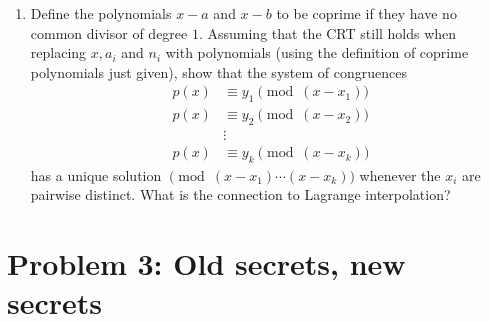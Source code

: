 \documentclass[11pt, notitlepage]{report}
\newcommand{\Question}[1]{\newpage\section{#1}}
\begin{document}
\begin{enumerate}[label=\alph*)]
\item Define the polynomials $x-a$ and $x-b$ to be coprime if they have no common divisor 
of degree $1$. Assuming that the CRT still holds when replacing $x, a_i$ and $n_i$ with 
polynomials (using the definition of coprime polynomials just given), show that the system 
of congruences
\begin{align}
    p(x) & \equiv y_1 \pmod{(x-x_1)} \tag{1'} \\
    p(x) & \equiv y_2 \pmod{(x-x_2)} \tag{2'} \\
    &\vdots \tag{$\vdots$} \\
    p(x) & \equiv y_k \pmod{(x-x_k)} \tag{k'}
\end{align}
has a unique solution $\pmod{(x-x_1)\cdots(x-x_k)}$ whenever the $x_i$ are pairwise 
distinct. What is the connection to Lagrange interpolation?

\end{enumerate}


\Question{Problem 3: Old secrets, new secrets}
\end{document}
